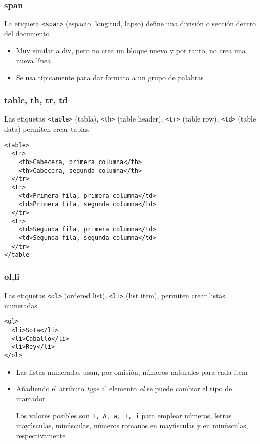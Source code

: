\documentclass[ucs]{beamer}
\begin{document}
\begin{frame}[fragile]
\frametitle{span}
La etiqueta 
\verb|<span>|  (espacio, longitud, lapso)
define una división o sección dentro del documento
\begin{itemize}
\item
Muy similar a div, pero no crea un bloque nuevo y por tanto,
no crea una nueva línea

\item
Se usa típicamente para dar formato a un grupo de palabras
\end{itemize}

\end{frame}




\begin{frame}[fragile]
\frametitle{table, th, tr, td}
Las etiquetas 
\verb|<table>| (tabla),
\verb|<th>| (table header),
\verb|<tr>| (table row),
\verb|<td>| (table data)
permiten crear tablas

  \begin{footnotesize}
  \begin{verbatim}
<table>
  <tr>
    <th>Cabecera, primera columna</th>
    <th>Cabecera, segunda columna</th>
  </tr>
  <tr>
    <td>Primera fila, primera columna</td>
    <td>Primera fila, segunda columna</td>
  </tr>
  <tr>
    <td>Segunda fila, primera columna</td>
    <td>Segunda fila, segunda columna</td>
  </tr>
</table
  \end{verbatim}
  \end{footnotesize}


\end{frame}


\begin{frame}[fragile]
\frametitle{ol,li}
Las etiquetas 
\verb|<ol>| (ordered list),
\verb|<li>| (list item),
permiten crear listas numeradas 

  \begin{footnotesize}
  \begin{verbatim}
<ol>
  <li>Sota</li>
  <li>Caballo</li>
  <li>Rey</li>
</ol>
  \end{verbatim}
  \end{footnotesize}


    \begin{itemize}
    \item
Las listas numeradas usan, por omisión, números naturales para cada item

    \item

Añadiendo
el atributo \emph{type} al elemento \emph{ol} se puede cambiar el tipo de marcador

Los valores posibles son \verb|1, A, a, I, i| para emplear números, letras mayúsculas,
minúsculas, números romanos en mayúsculas y en minúsculas, respectivamente
    \end{itemize}

\end{frame}
\end{document}
